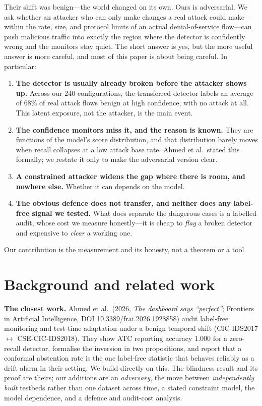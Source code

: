 \documentclass[11pt]{article}
\begin{document}
Their shift was benign---the world changed on its own. Ours is adversarial. We ask whether an attacker who can only make changes a real attack could make---within the rate, size, and protocol limits of an actual denial-of-service flow---can push malicious traffic into exactly the region where the detector is confidently wrong and the monitors stay quiet. The short answer is yes, but the more useful answer is more careful, and most of this paper is about being careful. In particular:
\begin{enumerate}[leftmargin=1.4em,itemsep=2pt]
\item \textbf{The detector is usually already broken before the attacker shows up.} Across our 240 configurations, the transferred detector labels an average of 68\% of real attack flows benign at high confidence, with no attack at all. This latent exposure, not the attacker, is the main event.
\item \textbf{The confidence monitors miss it, and the reason is known.} They are functions of the model's score distribution, and that distribution barely moves when recall collapses at a low attack base rate. Ahmed et al.\ stated this formally; we restate it only to make the adversarial version clear.
\item \textbf{A constrained attacker widens the gap where there is room, and nowhere else.} Whether it can depends on the model.
\item \textbf{The obvious defence does not transfer, and neither does any label-free signal we tested.} What does separate the dangerous cases is a labelled audit, whose cost we measure honestly---it is cheap to \emph{flag} a broken detector and expensive to \emph{clear} a working one.
\end{enumerate}
Our contribution is the measurement and its honesty, not a theorem or a tool.

\section{Background and related work}
\textbf{The closest work.} Ahmed et al.\ (2026, \emph{The dashboard says ``perfect''}; Frontiers in Artificial Intelligence, DOI 10.3389/frai.2026.1928858) audit label-free monitoring and test-time adaptation under a benign temporal shift (CIC-IDS2017 $\leftrightarrow$ CSE-CIC-IDS2018). They show ATC reporting accuracy 1.000 for a zero-recall detector, formalise the inversion in two propositions, and report that a conformal abstention rate is the one label-free statistic that behaves reliably as a drift alarm in their setting. We build directly on this. The blindness result and its proof are theirs; our additions are an \emph{adversary}, the move between \emph{independently built} testbeds rather than one dataset across time, a stated constraint model, the model dependence, and a defence and audit-cost analysis.
\end{document}
